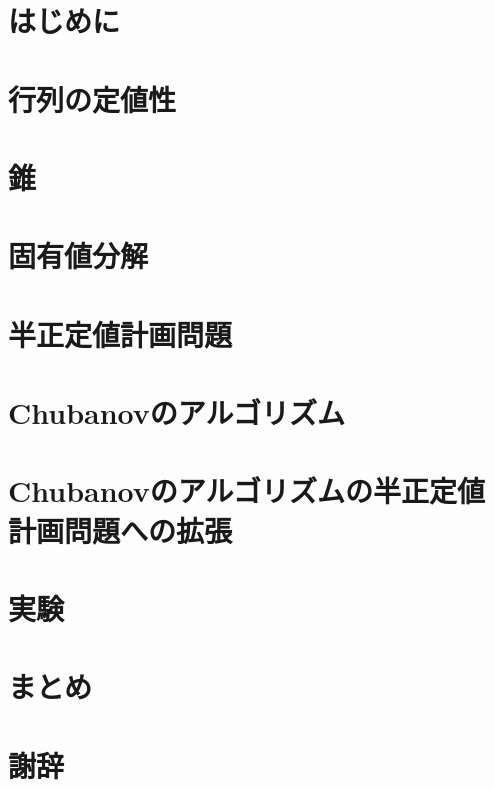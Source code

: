 \section{はじめに}


\section{行列の定値性}


\section{錐}


\section{固有値分解}


\section{半正定値計画問題}


\section{Chubanovのアルゴリズム}


\section{Chubanovのアルゴリズムの半正定値計画問題への拡張}


\section{実験}


\section{まとめ}


\section{謝辞}

